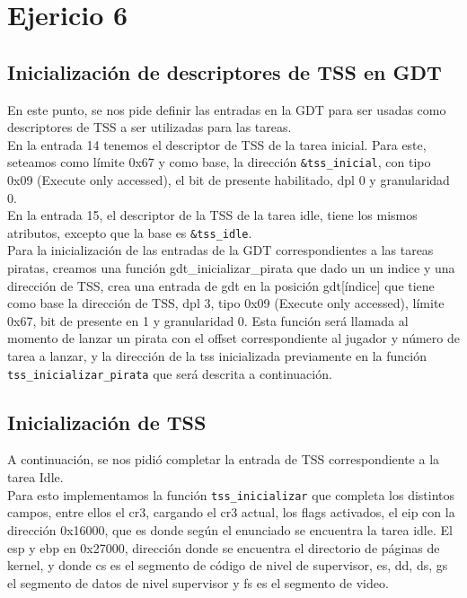 \section{Ejericio 6}
\subsection{Inicialización de descriptores de TSS en GDT}

En este punto, se nos pide definir las entradas en la GDT para ser usadas como descriptores de TSS a ser utilizadas para las tareas.\\

En la entrada 14 tenemos el descriptor de TSS de la tarea inicial. Para este, seteamos como límite 0x67 y como base, la dirección \texttt{\&tss\_inicial}, con tipo 0x09 (Execute only accessed), el bit de presente habilitado, dpl 0 y granularidad 0.\\

En la entrada 15, el descriptor de la TSS de la tarea idle, tiene los mismos atributos, excepto que la base es \texttt{\&tss\_idle}.\\

Para la inicialización de las entradas de la GDT correspondientes a las tareas piratas, creamos una función gdt\_inicializar\_pirata que dado un un indice y una dirección de TSS, crea una entrada de gdt en la posición gdt[índice] que tiene como base la dirección de TSS, dpl 3, tipo 0x09 (Execute only accessed), límite 0x67, bit de presente en 1 y granularidad 0. Esta función será llamada al momento de lanzar un pirata con el offset correspondiente al jugador y número de tarea a lanzar, y la dirección de la tss inicializada previamente en la función \texttt{tss\_inicializar\_pirata} que será descrita a continuación.


\subsection{Inicialización de TSS}

A continuación, se nos pidió completar la entrada de TSS correspondiente a la tarea Idle.\\

Para esto implementamos la función \texttt{tss\_inicializar} que completa los distintos campos, entre ellos el cr3, cargando el cr3 actual, los flags activados, el eip con la dirección 0x16000, que es donde según el enunciado se encuentra la tarea idle. El esp y ebp en 0x27000, dirección donde se encuentra el directorio de páginas de kernel, y donde cs es el segmento de código de nivel de supervisor, es, dd, ds, gs el segmento de datos de nivel supervisor y fs es el segmento de video.\\

